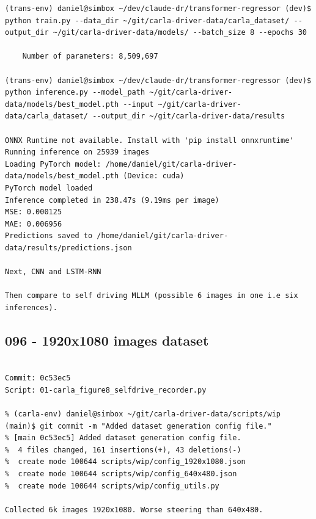 \begin{verbatim}
(trans-env) daniel@simbox ~/dev/claude-dr/transformer-regressor (dev)$ python train.py --data_dir ~/git/carla-driver-data/carla_dataset/ --output_dir ~/git/carla-driver-data/models/ --batch_size 8 --epochs 30

    Number of parameters: 8,509,697

(trans-env) daniel@simbox ~/dev/claude-dr/transformer-regressor (dev)$ python inference.py --model_path ~/git/carla-driver-data/models/best_model.pth --input ~/git/carla-driver-data/carla_dataset/ --output_dir ~/git/carla-driver-data/results

ONNX Runtime not available. Install with 'pip install onnxruntime'
Running inference on 25939 images
Loading PyTorch model: /home/daniel/git/carla-driver-data/models/best_model.pth (Device: cuda)
PyTorch model loaded
Inference completed in 238.47s (9.19ms per image)
MSE: 0.000125
MAE: 0.006956
Predictions saved to /home/daniel/git/carla-driver-data/results/predictions.json

Next, CNN and LSTM-RNN

Then compare to self driving MLLM (possible 6 images in one i.e six inferences).
\end{verbatim}

\subsection{096 - 1920x1080 images dataset}
\label{app_res:096}


\begin{verbatim}
    
Commit: 0c53ec5
Script: 01-carla_figure8_selfdrive_recorder.py

% (carla-env) daniel@simbox ~/git/carla-driver-data/scripts/wip (main)$ git commit -m "Added dataset generation config file."
% [main 0c53ec5] Added dataset generation config file.
%  4 files changed, 161 insertions(+), 43 deletions(-)
%  create mode 100644 scripts/wip/config_1920x1080.json
%  create mode 100644 scripts/wip/config_640x480.json
%  create mode 100644 scripts/wip/config_utils.py

Collected 6k images 1920x1080. Worse steering than 640x480.

\end{verbatim}

